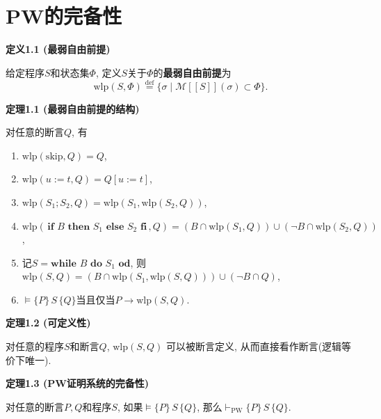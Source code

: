 \documentclass[UTF8]{ctexart}
\begin{document}
\setlength{\abovedisplayskip}{1pt}
\setlength{\belowdisplayskip}{1pt}

\section{PW的完备性}

\hypertarget{sec:定义1.1}{}
\noindent\textbf{定义1.1 (最弱自由前提)}

给定程序$S$和状态集$\Phi$, 定义$S$关于$\Phi$的\textbf{最弱自由前提}为
\[
    \mathrm{wlp}(S,\Phi)\overset{\mathrm{def}}{=}\{\sigma\mid
    \mathcal{M}[\![S]\!](\sigma)\subset\Phi\}.
\]

\vspace{10pt}

\hypertarget{sec:定理1.1}{}
\noindent\textbf{定理1.1 (最弱自由前提的结构)}

对任意的断言$Q$, 有
\begin{enumerate}
    \item $\mathrm{wlp}(\mathrm{skip},Q)=Q$,
    \item $\mathrm{wlp}(u:=t,Q)=Q[u:=t]$,
    \item $\mathrm{wlp}(S_1;S_2,Q)=\mathrm{wlp}(S_1,\mathrm{wlp}(S_2,Q))$,
    \item $\mathrm{wlp}(\,\mathbf{if}\,\,B\,\,\mathbf{then}\,\,S_1\,\,
        \mathbf{else}\,\,S_2\,\,\mathbf{fi}\,,Q)
        =(B\cap\mathrm{wlp}(S_1,Q))\cup(\neg B\cap\mathrm{wlp}(S_2,Q))$,
    \item 记$S=\mathbf{while}\,\,B\,\,\mathbf{do}\,\,S_1\,\,\mathbf{od}$, 则
    $\mathrm{wlp}(S,Q)=(B\cap\mathrm{wlp}(S_1,\mathrm{wlp}(S,Q)))
    \cup(\neg B\cap Q)$,
    \item $\models\{P\}\,S\,\{Q\}$当且仅当$P\to\mathrm{wlp}(S,Q)$.
\end{enumerate}

\vspace{10pt}

\hypertarget{sec:定理1.2}{}
\noindent\textbf{定理1.2 (可定义性)}

对任意的程序$S$和断言$Q$, $\mathrm{wlp}(S,Q)$
可以被断言定义, 从而直接看作断言(逻辑等价下唯一).

\vspace{10pt}

\hypertarget{sec:定理1.3}{}
\noindent\textbf{定理1.3 (PW证明系统的完备性)}

对任意的断言$P,Q$和程序$S$, 如果$\models\{P\}\,S\,\{Q\}$,
那么$\vdash_{\mathrm{PW}}\{P\}\,S\,\{Q\}$.

\end{document}
